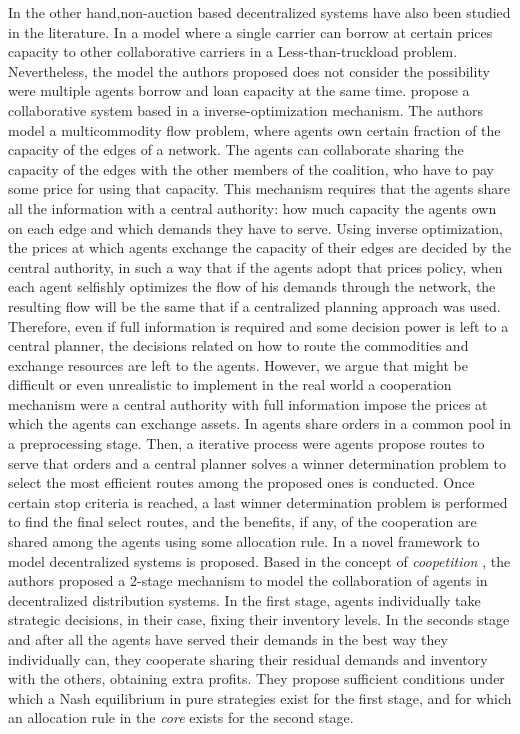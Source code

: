 \documentclass[authoryear]{elsarticle}
\begin{document}
In the other hand,non-auction based decentralized systems have also been studied in the literature. In \cite{HERNANDEZ2014} a model where a single carrier can borrow at certain prices capacity to other collaborative carriers in a Less-than-truckload problem. Nevertheless, the model the authors proposed does not consider the possibility were multiple agents borrow and loan capacity at the same time. \cite{AGARWAL2008520}  propose a collaborative system based in a
inverse-optimization mechanism. The authors model a multicommodity flow problem, where agents own certain
fraction of the capacity of the edges of a network. The agents can collaborate sharing the capacity of the edges with the other members of the coalition, who have to pay some price for using that capacity. This mechanism requires that the agents share all the information with a central authority: how much capacity the agents own on each edge and which demands they have to serve.  Using inverse optimization, the prices at which agents exchange the capacity of their edges are decided by the central authority, in such a way that if the agents adopt that prices policy, when each
agent selfishly optimizes the flow of his demands through the network, the resulting flow will be the same that if a centralized planning approach was used. Therefore, even if full information is required and some decision power is left to a central planner, the decisions related on how to route the commodities and exchange resources are left to the agents. However, we argue that might be difficult or even unrealistic to implement in the real world a cooperation mechanism were a central authority with full information impose the prices at which the agents can exchange assets. In \cite{WANG2014} agents share orders in a common pool in a preprocessing stage. Then, a iterative process were agents propose routes to serve that orders and a central planner solves a winner determination problem to select the most efficient routes among the proposed ones is conducted. Once certain stop criteria is reached, a last winner determination problem is performed to find the final select routes, and the benefits, if any, of the cooperation are shared among the agents using some allocation rule.
In \cite{ANUPINDI2001} a novel framework to model decentralized systems is proposed. Based in the concept of \emph{coopetition} \citep{BRANDENBURGER1996},
the authors proposed a 2-stage mechanism to model the collaboration of agents in
decentralized distribution systems. In the first stage, agents individually
take strategic decisions, in their case, fixing their inventory levels. In the
seconds stage and after all the agents have served their demands in the best way they individually can, they cooperate sharing their residual demands and inventory with the others, obtaining extra profits. They propose sufficient conditions under which a Nash equilibrium in pure strategies exist for the first stage, and for which an allocation rule in the \emph{core} exists for the second stage.
\end{document}
